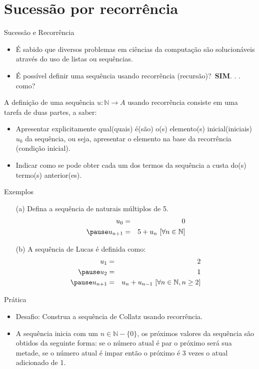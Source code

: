 \section{Sucessão por recorrência}

\begin{frame}{Sucessão e Recorrência}
  \begin{itemize}
    \item É sabido que diversos problemas em ciências da computação são solucionáveis através do uso de listas ou sequências.
    \item É possível definir uma sequência usando recorrência (recursão)?\pause \ \textbf{SIM}. . .\pause \ {\color{red} como}?
  \end{itemize}
  \pause
  A definição de uma sequência $u: \mathbb{N} \rightarrow A$ usando recorrência consiste em uma tarefa de duas partes, a saber:
  \begin{itemize}
    \item Apresentar explicitamente qual(quais) é(são) o(s) elemento(s) inicial(iniciais) $u_0$ da sequência, ou seja, apresentar o elemento 
    na base da recorrência (condição inicial).\pause
    \item Indicar como se pode obter cada um dos termos da sequência a custa do(s) termo(s) anterior(es).
  \end{itemize}
\end{frame}

\begin{frame}{Exemplos}
  \begin{itemize}
    \item[(a)] Defina a sequência de naturais múltiplos de 5.
    \pause
    \begin{eqnarray*}
      u_0 & = & 0\\ \pause
      u_{n + 1} & = & 5 + u_{n} \ [\forall n \in \mathbb{N}]
    \end{eqnarray*}
    \pause
    \item[(b)] A sequência de Lucas é definida como:
    \pause
    \begin{eqnarray*}
      u_1 & = & 2\\ \pause
      u_2 & = & 1\\ \pause
      u_{n + 1} & = & u_{n} + u_{n - 1} \ [\forall n \in \mathbb{N}, n \geq 2]
    \end{eqnarray*}
  \end{itemize}
\end{frame}

\begin{frame}{Prática}
  \begin{itemize}
    \item {\color{red}Desafio}: Construa a sequência de Collatz usando recorrência.
    \item A sequência inicia com um $n \in \mathbb{N} - \{0\}$, os próximos valores da sequência são obtidos da seguinte forma: se o número 
    atual é par o próximo será sua metade, se o número atual é impar então o próximo é 3 vezes o atual adicionado de 1.
  \end{itemize}
\end{frame}

